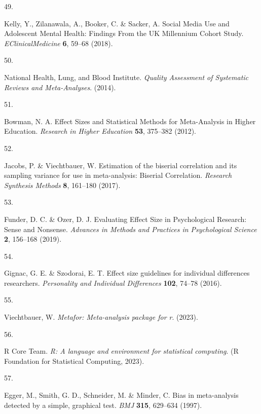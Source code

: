 \documentclass[
  english,
  man]{apa6}
\newlength{\cslhangindent}
\newlength{\csllabelwidth}
\newenvironment{CSLReferences}[2] %
 {%
  \setlength{\parindent}{0pt}
  \ifodd #1 \everypar{\setlength{\hangindent}{\cslhangindent}}\ignorespaces\fi
  \ifnum #2 > 0
  \setlength{\parskip}{#2\baselineskip}
  \fi
 }%
 {}
\newcommand{\CSLLeftMargin}[1]{\parbox[t]{\csllabelwidth}{#1}}
\newcommand{\CSLRightInline}[1]{\parbox[t]{\linewidth - \csllabelwidth}{#1}\break}
\begin{document}
\begin{CSLReferences}{0}{0}
\leavevmode{}%
\CSLLeftMargin{49. }
\CSLRightInline{Kelly, Y., Zilanawala, A., Booker, C. \& Sacker, A. Social {Media Use} and {Adolescent Mental Health}: {Findings From} the {UK Millennium Cohort Study}. \emph{EClinicalMedicine} \textbf{6}, 59--68 (2018).}

\leavevmode{}%
\CSLLeftMargin{50. }
\CSLRightInline{National Health, Lung, and Blood Institute. \emph{Quality {Assessment} of {Systematic Reviews} and {Meta-Analyses}}. (2014).}

\leavevmode{}%
\CSLLeftMargin{51. }
\CSLRightInline{Bowman, N. A. Effect {Sizes} and {Statistical Methods} for {Meta-Analysis} in {Higher Education}. \emph{Research in Higher Education} \textbf{53}, 375--382 (2012).}

\leavevmode{}%
\CSLLeftMargin{52. }
\CSLRightInline{Jacobs, P. \& Viechtbauer, W. Estimation of the biserial correlation and its sampling variance for use in meta-analysis: {Biserial Correlation}. \emph{Research Synthesis Methods} \textbf{8}, 161--180 (2017).}

\leavevmode{}%
\CSLLeftMargin{53. }
\CSLRightInline{Funder, D. C. \& Ozer, D. J. Evaluating {Effect Size} in {Psychological Research}: {Sense} and {Nonsense}. \emph{Advances in Methods and Practices in Psychological Science} \textbf{2}, 156--168 (2019).}

\leavevmode{}%
\CSLLeftMargin{54. }
\CSLRightInline{Gignac, G. E. \& Szodorai, E. T. Effect size guidelines for individual differences researchers. \emph{Personality and Individual Differences} \textbf{102}, 74--78 (2016).}

\leavevmode{}%
\CSLLeftMargin{55. }
\CSLRightInline{Viechtbauer, W. \emph{Metafor: Meta-analysis package for r}. (2023).}

\leavevmode{}%
\CSLLeftMargin{56. }
\CSLRightInline{R Core Team. \emph{R: A language and environment for statistical computing}. (R Foundation for Statistical Computing, 2023).}

\leavevmode{}%
\CSLLeftMargin{57. }
\CSLRightInline{Egger, M., Smith, G. D., Schneider, M. \& Minder, C. Bias in meta-analysis detected by a simple, graphical test. \emph{BMJ} \textbf{315}, 629--634 (1997).}


\end{CSLReferences}
\end{document}
